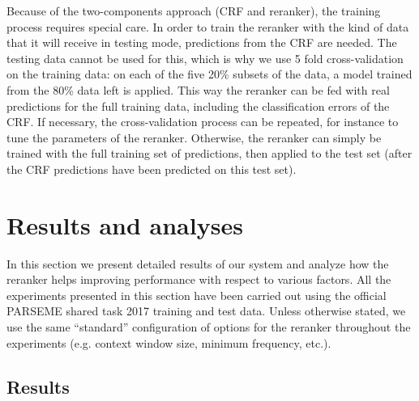 \documentclass[output=paper,modfonts,nonflat]{langsci/langscibook}
\begin{document}
Because of the two-components approach (CRF and reranker), the
training process requires special care. In order to train the reranker
with the kind of data that it will receive in testing mode,
predictions from the CRF are needed. The testing data cannot
be used for this, which is why we use 5 fold cross-validation on the
training data: on each of the five 20\% subsets of the data, a model
trained from the 80\% data left is applied.  This way the reranker can
be fed with real predictions for the full training data, including the
classification errors of the CRF. If necessary, the cross-validation
process can be repeated, for instance to tune the parameters of the
reranker. Otherwise, the reranker can simply be trained with the full
training set of predictions, then applied to the test set (after the
CRF predictions have been predicted on this test set).

\section{\label{moreau:sec:analysis}Results and analyses}


In this section we present detailed results of our system and analyze
how the reranker helps improving performance with respect to various
factors. All the experiments presented in this section have been
carried out using the official PARSEME shared task 2017 training and
test data. Unless otherwise stated, we use the same ``standard''
configuration of options for the reranker throughout the experiments
(e.g. context window size, minimum frequency, etc.).



\subsection{Results}
\end{document}

